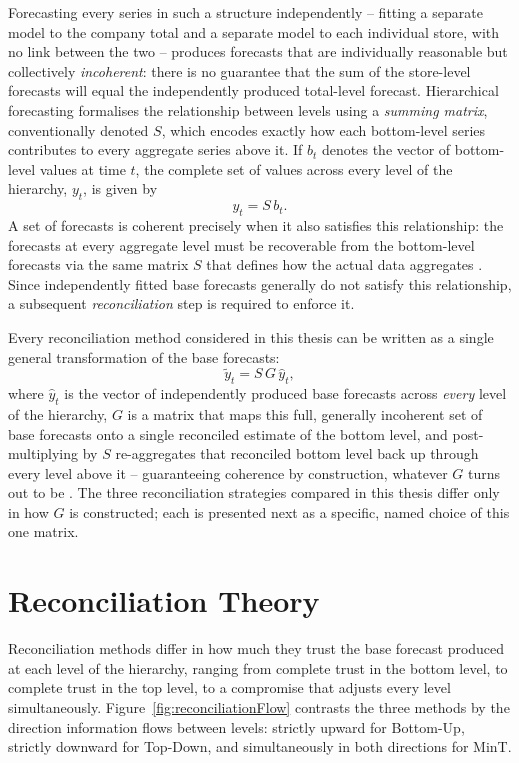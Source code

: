 Forecasting every series in such a structure independently -- fitting a separate model to the company total and a separate model to each individual store, with no link between the two -- produces forecasts that are individually reasonable but collectively \emph{incoherent}: there is no guarantee that the sum of the store-level forecasts will equal the independently produced total-level forecast. Hierarchical forecasting formalises the relationship between levels using a \emph{summing matrix}, conventionally denoted $S$, which encodes exactly how each bottom-level series contributes to every aggregate series above it. If $b_t$ denotes the vector of bottom-level values at time $t$, the complete set of values across every level of the hierarchy, $y_t$, is given by
\[
y_t = S\, b_t .
\]
A set of forecasts is coherent precisely when it also satisfies this relationship: the forecasts at every aggregate level must be recoverable from the bottom-level forecasts via the same matrix $S$ that defines how the actual data aggregates \cite{Hyndman:2018}. Since independently fitted base forecasts generally do not satisfy this relationship, a subsequent \emph{reconciliation} step is required to enforce it.

Every reconciliation method considered in this thesis can be written as a single general transformation of the base forecasts:
\[
\tilde{y}_t = S\, G\, \hat{y}_t ,
\]
where $\hat{y}_t$ is the vector of independently produced base forecasts across \emph{every} level of the hierarchy, $G$ is a matrix that maps this full, generally incoherent set of base forecasts onto a single reconciled estimate of the bottom level, and post-multiplying by $S$ re-aggregates that reconciled bottom level back up through every level above it -- guaranteeing coherence by construction, whatever $G$ turns out to be \cite{Wickramasuriya:2019}. The three reconciliation strategies compared in this thesis differ only in how $G$ is constructed; each is presented next as a specific, named choice of this one matrix.

\section{Reconciliation Theory}
\label{sec:reconciliationTheory}

Reconciliation methods differ in how much they trust the base forecast produced at each level of the hierarchy, ranging from complete trust in the bottom level, to complete trust in the top level, to a compromise that adjusts every level simultaneously. Figure~\ref{fig:reconciliationFlow} contrasts the three methods by the direction information flows between levels: strictly upward for Bottom-Up, strictly downward for Top-Down, and simultaneously in both directions for MinT.


